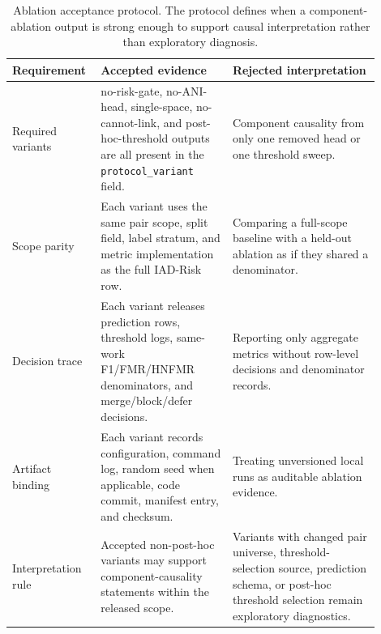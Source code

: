 \documentclass[11pt]{article}
\begin{document}
\begin{table}[H]
\caption{Ablation acceptance protocol. The protocol defines when a component-ablation output is strong enough to support causal interpretation rather than exploratory diagnosis.}
\label{tab:ablation-acceptance-protocol}
\centering
\footnotesize
\setlength{\tabcolsep}{2pt}
\begin{tabular}{L{0.18\linewidth}L{0.34\linewidth}L{0.38\linewidth}}
\toprule
Requirement & Accepted evidence & Rejected interpretation \\
\midrule
Required variants & no-risk-gate, no-ANI-head, single-space, no-cannot-link, and post-hoc-threshold outputs are all present in the \texttt{protocol\_variant} field. & Component causality from only one removed head or one threshold sweep. \\
Scope parity & Each variant uses the same pair scope, split field, label stratum, and metric implementation as the full IAD-Risk row. & Comparing a full-scope baseline with a held-out ablation as if they shared a denominator. \\
Decision trace & Each variant releases prediction rows, threshold logs, same-work F1/FMR/HNFMR denominators, and merge/block/defer decisions. & Reporting only aggregate metrics without row-level decisions and denominator records. \\
Artifact binding & Each variant records configuration, command log, random seed when applicable, code commit, manifest entry, and checksum. & Treating unversioned local runs as auditable ablation evidence. \\
Interpretation rule & Accepted non-post-hoc variants may support component-causality statements within the released scope. & Variants with changed pair universe, threshold-selection source, prediction schema, or post-hoc threshold selection remain exploratory diagnostics. \\
\bottomrule
\end{tabular}
\end{table}
\end{document}
